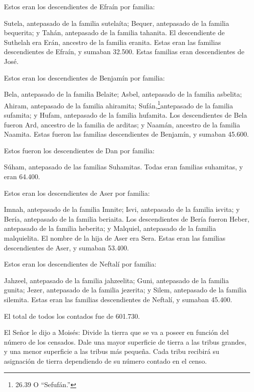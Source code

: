  Estos eran los descendientes de Efraín por familia:

Sutela, antepasado de la familia sutelaíta; Bequer, antepasado de la
familia bequerita; y Tahán, antepasado de la familia tahanita.
 El descendiente de Suthelah era Erán, ancestro de la
familia eranita.  Estas eran las familias descendientes de
Efraín, y sumaban 32.500. Estas familias eran descendientes de José.

 Estos eran los descendientes de Benjamín por familia:

Bela, antepasado de la familia Belaite; Asbel, antepasado de la familia
asbelita; Ahiram, antepasado de la familia ahiramita; 
Sufán,\footnote{26.39 O ``Sefufán.''}antepasado de la familia sufamita;
y Hufam, antepasado de la familia hufamita.  Los
descendientes de Bela fueron Ard, ancestro de la familia de arditas; y
Naamán, ancestro de la familia Naamita.  Estas fueron las
familias descendientes de Benjamín, y sumaban 45.600.

 Estos fueron los descendientes de Dan por familia:

Súham, antepasado de las familias Suhamitas.  Todas eran
familias suhamitas, y eran 64.400.

 Estos eran los descendientes de Aser por familia:

Imnah, antepasado de la familia Imnite; Isvi, antepasado de la familia
isvita; y Bería, antepasado de la familia beriaita.  Los
descendientes de Bería fueron Heber, antepasado de la familia heberita;
y Malquiel, antepasado de la familia malquielita.  El
nombre de la hija de Aser era Sera.  Estas eran las
familias descendientes de Aser, y sumaban 53.400.

 Estos eran los descendientes de Neftalí por familia:

Jahzeel, antepasado de la familia jahzeelita; Guni, antepasado de la
familia gunita;  Jezer, antepasado de la familia jezerita;
y Silem, antepasado de la familia silemita.  Estas eran las
familias descendientes de Neftalí, y sumaban 45.400.

 El total de todos los contados fue de 601.730.

 El Señor le dijo a Moisés:  Divide la tierra
que se va a poseer en función del número de los censados. 
Dale una mayor superficie de tierra a las tribus grandes, y una menor
superficie a las tribus más pequeña. Cada tribu recibirá su asignación
de tierra dependiendo de su número contado en el censo.

